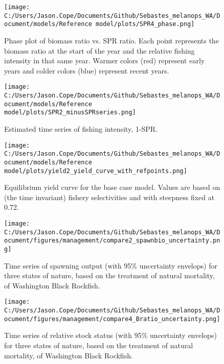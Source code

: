 \documentclass[11pt,
  letterpaper,
]{article}
\begin{document}
\begin{figure}
{\centering
\texttt{[image: C:/Users/Jason.Cope/Documents/Github/Sebastes\_melanops\_WA/Document/models/Reference model/plots/SPR4\_phase.png]}
}
\caption{Phase plot of biomass ratio vs. SPR ratio. Each point represents the biomass ratio at the start of the year and the relative fishing intensity in that same year. Warmer colors (red) represent early years and colder colors (blue) represent recent years.\label{fig:phase}}
\end{figure}

\pagebreak

\begin{figure}
{\centering
\texttt{[image: C:/Users/Jason.Cope/Documents/Github/Sebastes\_melanops\_WA/Document/models/Reference model/plots/SPR2\_minusSPRseries.png]}
}
\caption{Estimated time series of fishing intensity, 1-SPR.\label{fig:1-spr}}
\end{figure}

\pagebreak

\begin{figure}
{\centering
\texttt{[image: C:/Users/Jason.Cope/Documents/Github/Sebastes\_melanops\_WA/Document/models/Reference model/plots/yield2\_yield\_curve\_with\_refpoints.png]}
}
\caption{Equilibrium yield curve for the base case model. Values are based on (the time
invariant) fishery selectivities and with steepness fixed at 0.72.\label{fig:yield}}
\end{figure}

\pagebreak

\begin{figure}
{\centering
\texttt{[image: C:/Users/Jason.Cope/Documents/Github/Sebastes\_melanops\_WA/Document/figures/management/compare2\_spawnbio\_uncertainty.png]}
}
\caption{Time series of spawning output (with 95\% uncertainty envelops) for three states of nature, based on the treatment of natural mortality, of Washington Black Rockfish.\label{fig:stateofnature_SO}}
\end{figure}

\begin{figure}
{\centering
\texttt{[image: C:/Users/Jason.Cope/Documents/Github/Sebastes\_melanops\_WA/Document/figures/management/compare4\_Bratio\_uncertainty.png]}
}
\caption{Time series of relative stock status (with 95\% uncertainty envelops) for three states of nature, based on the treatment of natural mortality, of Washington Black Rockfish.\label{fig:stateofnature_depl}}
\end{figure}
\end{document}
